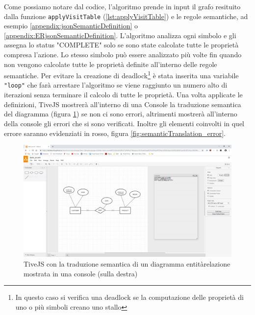                 Come possiamo notare dal codice, l'algoritmo prende in input il grafo resituito dalla funzione \texttt{applyVisitTable} (\ref{lst:applyVisitTable}) e le regole semantiche, ad esempio \ref{appendix:jsonSemanticDefinition} o \ref{appendix:ERjsonSemanticDefinition}.
                L'algoritmo analizza ogni simbolo e gli assegna lo status "COMPLETE" solo se sono state calcolate tutte le proprietà compresa l'azione. Lo stesso simbolo può essere analizzato più volte fin quando non vengono calcolate tutte le proprietà definite all'interno delle regole semantiche. Per evitare la creazione di deadlock\footnote{In questo caso si verifica una deadlock se la computazione delle proprietà di uno o più simboli creano uno stallo} è stata inserita una variabile \texttt{"loop"} che farà arrestare l'algoritmo se viene raggiunto un numero alto di iterazioni senza terminare il calcolo di tutte le proprietà.
                \newline
                Una volta applicate le definizioni, TiveJS mostrerà all'interno di una Console la traduzione semantica del diagramma (figura \ref{fig:semanticTranslation}) se non ci sono errori, altrimenti mostrerà all'interno della console gli errori che si sono verificati. Inoltre gli elementi coinvolti in quel errore saranno evidenziati in rosso, figura \ref{fig:semanticTranslation_error}.
                \begin{figure}[htbp]
                    \centering
                    \includegraphics[scale=0.20]{Figure/semanticTranslation.PNG}
                    \caption{TiveJS con la traduzione semantica di un diagramma entità\-relazione mostrata in una console (sulla destra)}
                    \label{fig:semanticTranslation}
                \end{figure}


